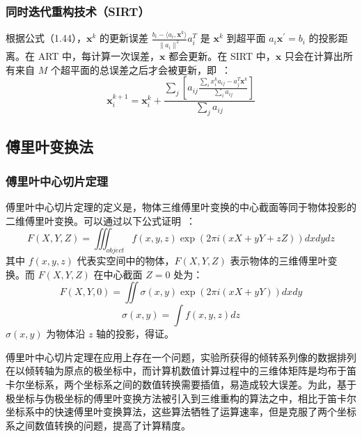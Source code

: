 \subsubsection{同时迭代重构技术（SIRT）}
根据公式（1.44），$\boldsymbol{x}^k$ 的更新误差 $\frac{b_i-\langle a_i,\boldsymbol{x}^k \rangle}{\| a_i\|^2}a_i^T$ 是 $\boldsymbol{x}^k$ 到超平面 \(a_i\boldsymbol{x}^{\prime}=b_i\) 的投影距离。在 ART 中，每计算一次误差，$\boldsymbol{x}$ 都会更新。在 SIRT 中，$\boldsymbol{x}$ 只会在计算出所有来自 $M$ 个超平面的总误差之后才会被更新，即~\cite{Andersen1984,Kak1988}：
\begin{equation}
\boldsymbol{x}^{k+1}_i = \boldsymbol{x}^k_i + \frac{\sum_j\left[a_{ij}\frac{\sum_ix_i^ka_{ij}-a_j^T\boldsymbol{x}^k}{\sum_ia_{ij}}\right]}{\sum_ja_{ij}}
\end{equation}

\subsection{傅里叶变换法}
\subsubsection{傅里叶中心切片定理}
傅里叶中心切片定理的定义是，物体三维傅里叶变换的中心截面等同于物体投影的二维傅里叶变换。可以通过以下公式证明~\cite{Frank2006}：
\begin{equation}
F(X,Y,Z)=\iiint_{object} f(x,y,z)\exp \left(2\pi i(xX+yY+zZ)\right)dxdydz
\end{equation}
其中 $f(x,y,z)$ 代表实空间中的物体，$F(X,Y,Z)$ 表示物体的三维傅里叶变换。而 $F(X,Y,Z)$ 在中心截面 $Z=0$ 处为：
\begin{equation}
F(X,Y,0) = \iint \sigma(x,y)\exp\left(2\pi i (xX+yY)\right)dxdy
\end{equation}
\begin{equation}
\sigma(x,y)=\int f(x,y,z)dz
\end{equation}
$\sigma(x,y)$ 为物体沿 $z$ 轴的投影，得证。

傅里叶中心切片定理在应用上存在一个问题，实验所获得的倾转系列像的数据排列在以倾转轴为原点的极坐标中，而计算机数值计算过程中的三维体矩阵是均布于笛卡尔坐标系，两个坐标系之间的数值转换需要插值，易造成较大误差。为此，基于极坐标与伪极坐标的傅里叶变换方法被引入到三维重构的算法之中，相比于笛卡尔坐标系中的快速傅里叶变换算法，这些算法牺牲了运算速率，但是克服了两个坐标系之间数值转换的问题，提高了计算精度。

